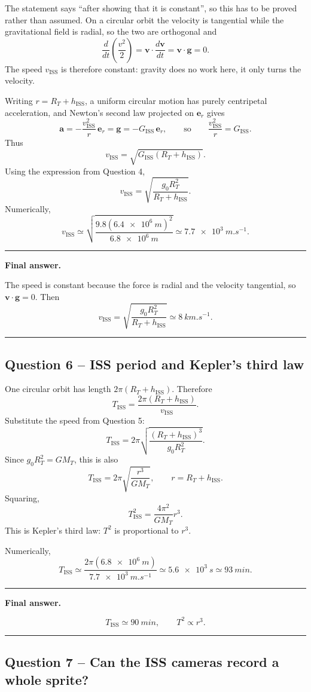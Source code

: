 \documentclass[11pt,a4paper]{article}
\newenvironment{finalanswer}{%
  \begin{center}\begin{minipage}{0.94\linewidth}\hrule\vspace{0.45em}\textbf{Final answer. }%
}{%
  \vspace{0.45em}\hrule\end{minipage}\end{center}%
}
\newcommand{\RT}{R_T}
\newcommand{\ISS}{\mathrm{ISS}}
\begin{document}
The statement says ``after showing that it is constant'', so this has to be
proved rather than assumed. On a circular orbit the velocity is tangential while
the gravitational field is radial, so the two are orthogonal and
\[
 \frac{d}{dt}\!\left(\frac{v^2}{2}\right)
 =\mathbf v\cdot\frac{d\mathbf v}{dt}
 =\mathbf v\cdot\mathbf g=0 .
\]
The speed $v_{\ISS}$ is therefore constant: gravity does no work here, it only
turns the velocity.

Writing $r=\RT+h_{\ISS}$, a uniform circular motion has purely centripetal
acceleration, and Newton's second law projected on $\mathbf e_r$ gives
\[
 \mathbf a=-\frac{v_{\ISS}^2}{r}\,\mathbf e_r=\mathbf g=-G_{\ISS}\,\mathbf e_r,
 \qquad\text{so}\qquad
 \frac{v_{\ISS}^2}{r}=G_{\ISS}.
\]
Thus
\[
 v_{\ISS}=\sqrt{G_{\ISS}(\RT+h_{\ISS})}.
\]
Using the expression from Question 4,
\[
 v_{\ISS}=\sqrt{\frac{g_0\RT^2}{\RT+h_{\ISS}}}.
\]
Numerically,
\[
 v_{\ISS}\simeq\sqrt{\frac{9.8(\SI{6.4e6}{m})^2}{\SI{6.8e6}{m}}}
 \simeq \SI{7.7e3}{m.s^{-1}}.
\]

\begin{finalanswer}
The speed is constant because the force is radial and the velocity tangential, so $\mathbf v\cdot\mathbf g=0$. Then
\[
v_{\ISS}=\sqrt{\frac{g_0\RT^2}{\RT+h_{\ISS}}}\simeq\SI{8}{km.s^{-1}}.
\]
\end{finalanswer}

\subsection*{Question 6 -- ISS period and Kepler's third law}

One circular orbit has length $2\pi(\RT+h_{\ISS})$. Therefore
\[
 T_{\ISS}=\frac{2\pi(\RT+h_{\ISS})}{v_{\ISS}}.
\]
Substitute the speed from Question 5:
\[
 T_{\ISS}=2\pi\sqrt{\frac{(\RT+h_{\ISS})^3}{g_0\RT^2}}.
\]
Since $g_0\RT^2=G M_T$, this is also
\[
 T_{\ISS}=2\pi\sqrt{\frac{r^3}{G M_T}},\qquad r=\RT+h_{\ISS}.
\]
Squaring,
\[
 T_{\ISS}^2=\frac{4\pi^2}{G M_T}r^3.
\]
This is Kepler's third law: $T^2$ is proportional to $r^3$.

Numerically,
\[
 T_{\ISS}\simeq \frac{2\pi(\SI{6.8e6}{m})}{\SI{7.7e3}{m.s^{-1}}}
 \simeq\SI{5.6e3}{s}
 \simeq\SI{93}{min}.
\]

\begin{finalanswer}
\[
T_{\ISS}\simeq\SI{90}{min},\qquad T^2\propto r^3.
\]
\end{finalanswer}

\subsection*{Question 7 -- Can the ISS cameras record a whole sprite?}
\end{document}
